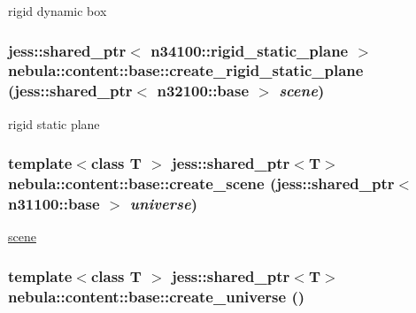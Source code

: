 rigid dynamic box \hypertarget{classnebula_1_1content_1_1base_a42c450fa53188f3909f010b30f616e17}{
\subsubsection[{create\_\-rigid\_\-static\_\-plane}]{\setlength{\rightskip}{0pt plus 5cm}jess::shared\_\-ptr$<$ {\bf n34100::rigid\_\-static\_\-plane} $>$ nebula::content::base::create\_\-rigid\_\-static\_\-plane (jess::shared\_\-ptr$<$ {\bf n32100::base} $>$ {\em scene})}}
\label{classnebula_1_1content_1_1base_a42c450fa53188f3909f010b30f616e17}


rigid static plane \hypertarget{classnebula_1_1content_1_1base_a651e5ca08e102184f1b6bc77ea4e7148}{
\subsubsection[{create\_\-scene}]{\setlength{\rightskip}{0pt plus 5cm}template$<$class T $>$ jess::shared\_\-ptr$<$T$>$ nebula::content::base::create\_\-scene (jess::shared\_\-ptr$<$ {\bf n31100::base} $>$ {\em universe})}}
\label{classnebula_1_1content_1_1base_a651e5ca08e102184f1b6bc77ea4e7148}


\hyperlink{namespacenebula_1_1content_1_1scene}{scene} \hypertarget{classnebula_1_1content_1_1base_a60a8bd9bd890ae528fd3d35a48ca4ec7}{
\subsubsection[{create\_\-universe}]{\setlength{\rightskip}{0pt plus 5cm}template$<$class T $>$ jess::shared\_\-ptr$<$T$>$ nebula::content::base::create\_\-universe ()}}
\label{classnebula_1_1content_1_1base_a60a8bd9bd890ae528fd3d35a48ca4ec7}



